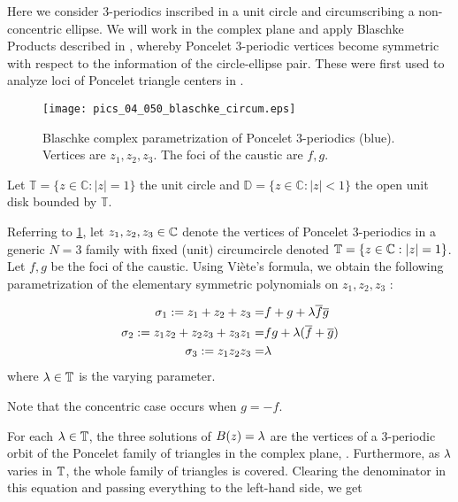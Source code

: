Here we consider 3-periodics inscribed in a unit circle and circumscribing a non-concentric ellipse. We will work in the complex plane and apply Blaschke Products described in \cite{daepp-2019}, whereby Poncelet 3-periodic vertices become symmetric with respect to the information of the circle-ellipse pair. These were first used to analyze loci of Poncelet triangle centers in \cite{helman2021-power-loci}.

\begin{figure}
    \centering
    \texttt{[image: pics\_04\_050\_blaschke\_circum.eps]}
    \caption{Blaschke complex parametrization of Poncelet 3-periodics (blue). Vertices are $z_1,z_2,z_3$. The foci of the caustic are $f,g$. }
    \label{fig:blaschke}
\end{figure}




Let  $\mathbb{T } = \{ z\in \mathbb{C}: |z| = 1\} $ the unit circle and $\mathbb{D} = \{ z\in\mathbb{C} : |z| < 1\} $ the open unit disk
bounded by $\mathbb{T }.$

Referring to \cref{fig:blaschke}, let $z_1,z_2,z_3\in\mathbb{C}$ denote the vertices of Poncelet 3-periodics in a generic $N=3$ family with fixed (unit) circumcircle denoted $\mathbb{T}=\{z\in\mathbb{C} : |z|=1\}$. Let $f,g$ be the foci of the caustic. Using Viète's formula, we obtain the following parametrization of the elementary symmetric polynomials on $z_1,z_2,z_3$ \cite{daepp-2019}:

\begin{definition}
\begin{align*}
    \sigma_1:=z_1+z_2+z_3=& f+g+\lambda\overline f \overline g \\
    \sigma_2:=z_1 z_2+z_2 z_3+z_3 z_1=& f g+\lambda(\overline f+\overline g) \\
    \sigma_3:=z_1 z_2 z_3=& \lambda
\end{align*}
where $\lambda\in\mathbb{T}$ is the varying parameter.
\label{def:bla}
\end{definition}

\noindent Note that the concentric case occurs when $g=-f$.

For each $\lambda\in\mathbb{T}$, the three solutions of $B(z)=\lambda$ are the vertices of a 3-periodic orbit of the Poncelet family of triangles in the complex plane, \cite[Chapter 4]{daepp-2019}. Furthermore, as $\lambda$ varies in $\mathbb{T}$, the whole family of triangles is covered. Clearing the denominator in this equation and passing everything to the left-hand side, we get

